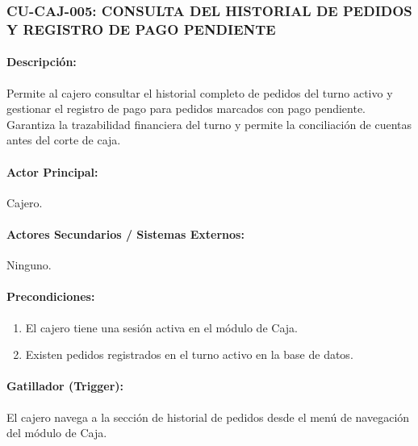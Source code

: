 \subsubsection{CU-CAJ-005: CONSULTA DEL HISTORIAL DE PEDIDOS Y REGISTRO DE PAGO PENDIENTE}
\paragraph{Descripción:} Permite al cajero consultar el historial completo de pedidos del turno activo y gestionar el registro de pago para pedidos marcados con pago pendiente. Garantiza la trazabilidad financiera del turno y permite la conciliación de cuentas antes del corte de caja.

\paragraph{Actor Principal:} Cajero.

\paragraph{Actores Secundarios / Sistemas Externos:} Ninguno.

\paragraph{Precondiciones:}
\begin{enumerate}
    \item[I.] El cajero tiene una sesión activa en el módulo de Caja.
    \item[II.] Existen pedidos registrados en el turno activo en la base de datos.
\end{enumerate}

\paragraph{Gatillador (Trigger):} El cajero navega a la sección de historial de pedidos desde el menú de navegación del módulo de Caja.

